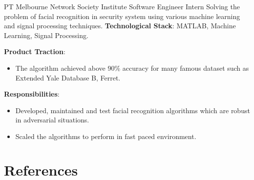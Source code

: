 \documentclass[12pt]{article} %
\begin{document}
\begin{paracol}{2}
{PT} %
{Melbourne Network Society Institute}
{Software Engineer Intern} %
{Solving the problem of facial recognition in security system using various machine learning and signal processing techniques.} 
{\textbf{Technological Stack}: MATLAB, Machine Learning, Signal Processing.} %
{\textbf{Product Traction}:
	\begin{itemize}
		\item The algorithm achieved above 90\% accuracy for many famous dataset such as Extended Yale Database B, Ferret.   
	\end{itemize}}
{\textbf{Responsibilities}:
	\begin{itemize}
		\setlength{\itemsep}{1pt}	
		\item Developed, maintained and test facial recognition algorithms which are robust in adversarial situations.
		\item Scaled the algorithms to perform in fast paced environment.   
	\end{itemize}}




\section{References}








\end{paracol}
\end{document}
